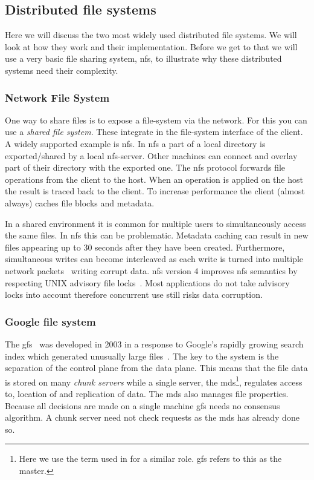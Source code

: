 \subsection{Distributed file systems}
Here we will discuss the two most widely used distributed file systems. We will look at how they work and their implementation. Before we get to that we will use a very basic file sharing system, \ac{nfs}, to illustrate why these distributed systems need their complexity.

\subsubsection*{Network File System}
One way to share files is to expose a file-system via the network. For this you can use a \textit{shared file system}. These integrate in the file-system interface of the client. A widely supported example is \acf{nfs}. In \ac{nfs} a part of a local directory is exported/shared by a local \ac{nfs}-server. Other machines can connect and overlay part of their directory with the exported one. The \ac{nfs} protocol forwards file operations from the client to the host. When an operation is applied on the host the result is traced back to the client. To increase performance the client (almost always) caches file blocks and metadata. 

In a shared environment it is common for multiple users to simultaneously access the same files. In \ac{nfs} this can be problematic. Metadata caching can result in new files appearing up to 30 seconds after they have been created. Furthermore, simultaneous writes can become interleaved as each write is turned into multiple network packets~\cite[p. 527]{os} writing corrupt data. \ac{nfs} version 4 improves \ac{nfs} semantics by respecting UNIX advisory file locks~\cite{rfc3530}. Most applications do not take advisory locks into account therefore concurrent use still risks data corruption. 

\subsubsection*{Google file system}
The \ac{gfs}~\cite{GFS} was developed in 2003 in a response to Google's rapidly growing search index which generated unusually large files~\cite{GFS_interview}. The key to the system is the separation of the control plane from the data plane. This means that the file data is stored on many \textit{chunk servers} while a single server, the \ac{mds}\footnote{Here we use the term used in \ceph{} for a similar role. \ac{gfs} refers to this as the master.}, regulates access to, location of and replication of data. The \ac{mds} also manages file properties. Because all decisions are made on a single machine \ac{gfs} needs no consensus algorithm. A chunk server need not check requests as the \ac{mds} has already done so. 

